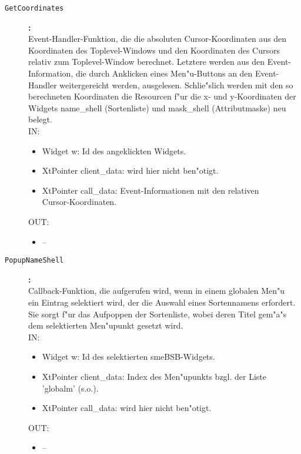 \begin{description}
\item[\tt GetCoordinates]{\bf :\\}
Event-Handler-Funktion, die die absoluten Cursor-Koordinaten aus den Koordinaten des Toplevel-Windows und den Koordinaten des Cursors relativ zum Toplevel-Window berechnet. Letztere werden aus den Event-Information, die durch Anklicken eines Men"u-Buttons an den Event-Handler weitergereicht werden, ausgelesen. Schlie"slich werden mit den so berechneten Koordinaten die Resourcen f"ur die x- und y-Koordinaten der Widgets name\_shell (Sortenliste) und mask\_shell (Attributmaske) neu belegt. \\
IN:
\begin{itemize}
   \item Widget w:      Id des angeklickten Widgets. \item XtPointer client\_data: wird hier nicht ben"otigt. \item XtPointer call\_data:   Event-Informationen mit den relativen\\
 Cursor-Koordinaten.
\end{itemize}
OUT:
\begin{itemize}
   \item --
\end{itemize}

\item[\tt PopupNameShell]{\bf :\\}
Callback-Funktion, die aufgerufen wird, wenn in einem globalen Men"u\\
 ein Eintrag selektiert wird, der die Auswahl eines Sortennamens erfordert. Sie sorgt f"ur das Aufpoppen der Sortenliste, wobei deren Titel gem"a"s dem selektierten Men"upunkt gesetzt wird. \\
IN:
\begin{itemize}
   \item Widget w:      Id des selektierten smeBSB-Widgets. \item XtPointer client\_data: Index des Men"upunkts bzgl. der Liste 'globalm' (s.o.). \item XtPointer call\_data:   wird hier nicht ben"otigt.
\end{itemize}
OUT:
\begin{itemize}
   \item --
\end{itemize}


\end{description}
